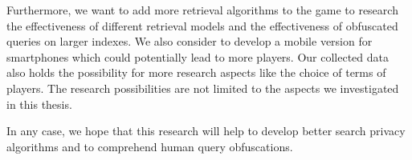 Furthermore, we want to add more retrieval algorithms to the game to research the effectiveness of different retrieval models and the effectiveness of obfuscated queries on larger indexes. We also consider to develop a mobile version for smartphones which could potentially lead to more players. Our collected data also holds the possibility for more research aspects like the choice of terms of players. The research possibilities are not limited to the aspects we investigated in this thesis.\par
In any case, we hope that this research will help to develop better search privacy algorithms and to comprehend human query obfuscations.